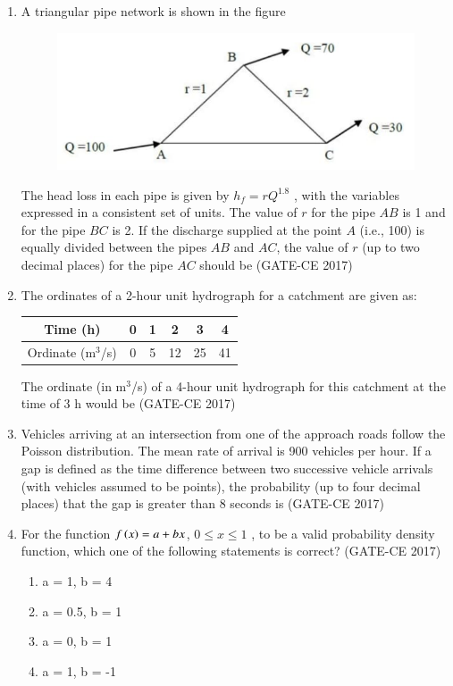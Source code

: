 \documentclass[journal,12pt,onecolumn]{article}
\theoremstyle{remark}
\begin{document}
\begin{enumerate}
    \item A triangular pipe network is shown in the figure 
    \begin{figure}[H]
    \centering
    \includegraphics[width=0.7\columnwidth]{imageq23.jpg}  
    \caption{}
    \label{fig:23}
    \end{figure}
    The head loss in each pipe is given by $h_f = rQ^{1.8}$ , with the variables expressed in a consistent set of units. The value of $r$ for the pipe $AB$ is 1 and for the pipe $BC$ is 2. If the discharge supplied at the point $ A $ (i.e., 100) is equally divided between the pipes $AB$ and $AC$, the value of $r$ (up to two decimal places) for the pipe $AC$ should be \underline{\hspace{3cm}}\hfill (GATE-CE 2017)

    \item The ordinates of a 2-hour unit hydrograph for a catchment are given as:
    \begin{table}[H]
    \centering
    \begin{tabular}{|c|c|c|c|c|c|}
    \hline
    Time (h) & 0 & 1 & 2 & 3 & 4 \\
    \hline
    Ordinate (m$^3$/s) & 0 & 5 & 12 & 25 & 41 \\
    \hline
    \end{tabular}
    \end{table}
    The ordinate (in m$^3$/s) of a 4-hour unit hydrograph for this catchment at the time of 3 h would be \underline{\hspace{3cm}}\hfill (GATE-CE 2017)

    \item Vehicles arriving at an intersection from one of the approach roads follow the Poisson distribution. The mean rate of arrival is 900 vehicles per hour. If a gap is defined as the time difference between two successive vehicle arrivals (with vehicles assumed to be points), the probability (up to four decimal places) that the gap is greater than 8 seconds is \underline{\hspace{3cm}}\hfill (GATE-CE 2017)

    \item For the function $f\left(x\right) = a + bx $, $0 \leq x \leq 1$ , to be a valid probability density function, which one of the following statements is correct? \hfill (GATE-CE 2017)
    \begin{multicols}{2}
    \begin{enumerate}
        \item a = 1, b = 4
        \item a = 0.5, b = 1
        \item a = 0, b = 1
        \item a = 1, b = -1
    \end{enumerate}
    \end{multicols}


\end{enumerate}
\end{document}
